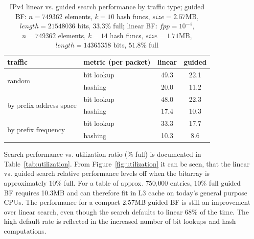 \documentclass[conference,compsoc]{IEEEtran}
\begin{document}
\begin{table}[]
\centering
\caption{IPv4 linear vs. guided search performance by traffic type; guided BF: $n=749362$ elements, $k=10$ hash funcs, $size=2.57$MB, $length=21548036$ bits, $33.3$\% full;
linear BF: $fpp=10^{-4}$, $n=749362$ elements, $k=14$ hash funcs, $size=1.71$MB, $length=14365358$ bits, $51.8$\% full}
\label{tab:traffic}

\begin{tabular}{llccl}
\hline
\textbf{traffic}                         & \textbf{metric (per packet)} & \textbf{linear}          & \multicolumn{2}{l}{\textbf{guided}} \\ \hline
\multirow{2}{*}{random}                  & bit lookup      & 49.3                     & \multicolumn{2}{c}{22.1}            \\ %
                                         & hashing         & 20.0                     & \multicolumn{2}{c}{11.2}            \\ \hline
\multirow{2}{*}{by prefix address space} & bit lookup      & 48.0                     & \multicolumn{2}{c}{22.3}            \\ %
                                         & hashing         & 17.4                     & \multicolumn{2}{c}{10.3}            \\ \hline
\multirow{2}{*}{by prefix frequency}     & bit lookup      & 33.3                     & \multicolumn{2}{c}{17.7}            \\ %
                                         & hashing         & 10.3                     & \multicolumn{2}{c}{8.6}             \\ \hline
\end{tabular}
\end{table}

Search performance vs. utilization ratio (\% full) is documented in
Table~\ref{tab:utilization}. From Figure~\ref{fig:utilization} it can be
seen, that the linear vs. guided search relative performance levels off 
when the bitarray is approximately 10\% full. 
For a table of approx. 750,000 entries,
10\% full guided BF requires 10.3MB and can therefore fit in
L3 cache on today's general purpose CPUs. The performance for a
compact 2.57MB guided BF is still an improvement over linear search, even 
though the search defaults to linear 68\% of the time. 
The high default rate is
reflected in the increased number of bit lookups and hash computations.
\end{document}

